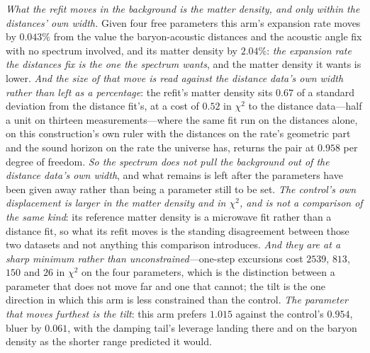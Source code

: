 \documentclass[11pt,a4paper]{article}
\theoremstyle{plain}
\theoremstyle{definition}
\theoremstyle{remark}
\begin{document}
\emph{What the refit moves in the background is the matter density, and only within the distances' own width.} Given four free parameters this arm's expansion rate
moves by $0.043\%$ from the value the baryon-acoustic distances and the
acoustic angle fix with no spectrum involved, and its matter density by $2.04\%$: \emph{the expansion rate the distances fix is the one the
spectrum wants}, and the matter density it wants is lower. \emph{And the size of that move is read against the distance data's own width
rather than left as a percentage}: the refit's matter density sits $0.67$ of a standard deviation from
the distance fit's, at a cost of $0.52$ in $\chi^{2}$ to the distance data---half a unit on thirteen
measurements---where the same fit run on the distances alone, on this construction's own ruler with the
distances on the rate's geometric part and the sound horizon on the rate the universe has, returns the pair at
$0.958$ per degree of freedom. \emph{So the spectrum does not pull the background out of the distance data's own width}, and what
remains is left after the parameters have been given away rather than being a parameter still to be
set. \emph{The control's own displacement is
larger in the matter density and in $\chi^{2}$, and is not a comparison of the same kind}: its reference matter density is a microwave fit
rather than a distance fit, so what its refit moves is the standing disagreement between those two
datasets and not anything this comparison introduces. \emph{And they are at a sharp minimum rather than unconstrained}---one-step excursions cost
$2539$, $813$, $150$ and $26$ in $\chi^{2}$ on the four parameters, which is the distinction between a
parameter that does not move far and one that cannot; the tilt is the one direction in which this arm is less
constrained than the control. \emph{The parameter that moves furthest is the tilt}: this
arm prefers $1.015$ against the control's $0.954$, bluer by $0.061$, with the damping tail's leverage landing
there and on the baryon density as the shorter range predicted it would.
\end{document}
